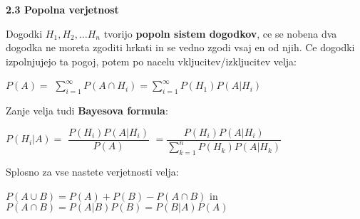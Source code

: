 \documentclass{article}
\begin{document}
\begin{multicols}{3}
\textbf{2.3 Popolna verjetnost}

Dogodki $H_{1}, H_{2}, \dots H_{n}$ tvorijo \textbf{popoln sistem dogodkov},
ce se nobena dva dogodka ne moreta zgoditi hrkati in se vedno
zgodi vsaj en od njih. Ce dogodki izpolnjujejo ta pogoj, potem po
nacelu vkljucitev/izkljucitev velja:
\begin{center}
    \begin{math}
        P(A) =
    \end{math}
    \smallskip
    \begin{math}
        \sum_{i=1}^{\infty} P(A \cap H_{i}) =
        \sum_{i=1}^{\infty} P(H_{1}) P(A | H_{i})
    \end{math}
\end{center}
Zanje velja tudi \textbf{Bayesova formula}:
\begin{center}
    \begin{math}
        P(H_{i} | A) = 
    \end{math}
    \begin{math}
        \dfrac{
            P(H_{i}) P(A | H_{i})
        }
        {
            P(A)
        }
    \end{math}
    \begin{math}
        = \dfrac{
            P(H_{i}) P(A | H_{i})
        }
        {
            \sum_{k=1}^{n} P(H_{k}) P(A | H_{k})
        }
    \end{math}        
\end{center}
Splosno za vse nastete verjetnosti velja:
\begin{center}
    \begin{math}
    P(A \cup B) = P(A) + P(B) - P(A \cap B)
    \end{math} in 
    \begin{math}
        P(A \cap B) = P(A | B) P(B) = P(B | A) P(A)
    \end{math}
\end{center}


\end{multicols}
\end{document}
